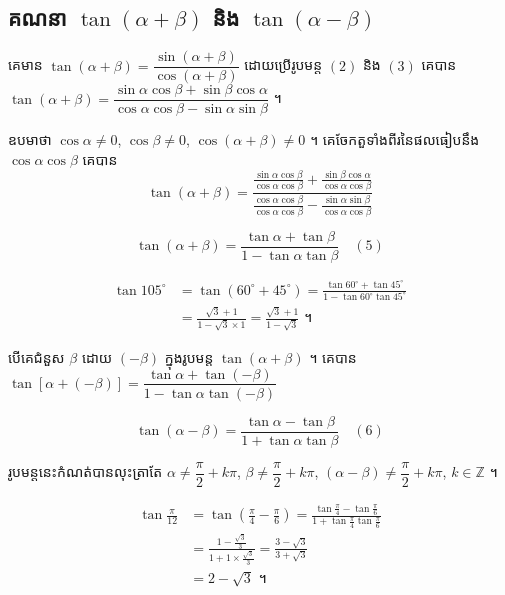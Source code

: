 \subsection{គណនា \texorpdfstring{$\tan(\alpha + \beta)$}{tan(α + β)} និង \texorpdfstring{$\tan(\alpha - \beta)$}{tan(α − β)}}

គេមាន $\tan(\alpha + \beta) = \dfrac{\sin(\alpha + \beta)}{\cos(\alpha + \beta)}$ ដោយប្រើរូបមន្ត $(2)$ និង $(3)$ គេបាន $\tan(\alpha + \beta) = \dfrac{\sin\alpha\cos\beta + \sin\beta\cos\alpha}{\cos\alpha\cos\beta - \sin\alpha\sin\beta}$ ។

ឧបមាថា $\cos\alpha \ne 0$, $\cos\beta \ne 0$, $\cos(\alpha + \beta) \ne 0$ ។ គេចែកតួទាំងពីរនៃផលធៀបនឹង $\cos\alpha\cos\beta$ គេបាន
\[ \tan(\alpha + \beta) = \frac{\frac{\sin\alpha\cos\beta}{\cos\alpha\cos\beta} + \frac{\sin\beta\cos\alpha}{\cos\alpha\cos\beta}}{\frac{\cos\alpha\cos\beta}{\cos\alpha\cos\beta} - \frac{\sin\alpha\sin\beta}{\cos\alpha\cos\beta}} \]
\begin{formulaBox}[ឬ]
\[ \tan(\alpha + \beta) = \frac{\tan\alpha + \tan\beta}{1 - \tan\alpha\tan\beta} \quad (5) \]
\end{formulaBox}

\begin{example}[ឧទាហរណ៍ ៦]
\[
\begin{aligned}
\tan 105^\circ &= \tan(60^\circ + 45^\circ) = \frac{\tan 60^\circ + \tan 45^\circ}{1 - \tan 60^\circ\tan 45^\circ}\\
&= \frac{\sqrt{3} + 1}{1 - \sqrt{3} \times 1} = \frac{\sqrt{3} + 1}{1 - \sqrt{3}} \text{ ។}
\end{aligned}
\]
\end{example}

បើគេជំនួស $\beta$ ដោយ $(-\beta)$ ក្នុងរូបមន្ត $\tan(\alpha + \beta)$ ។ គេបាន $\tan[\alpha + (-\beta)] = \dfrac{\tan\alpha + \tan(-\beta)}{1 - \tan\alpha\tan(-\beta)}$
\begin{formulaBox}[រូបមន្ត]
\[ \tan(\alpha - \beta) = \frac{\tan\alpha - \tan\beta}{1 + \tan\alpha\tan\beta} \quad (6) \]
\end{formulaBox}
រូបមន្តនេះកំណត់បានលុះត្រាតែ $\alpha \ne \dfrac{\pi}{2} + k\pi$, $\beta \ne \dfrac{\pi}{2} + k\pi$, $(\alpha - \beta) \ne \dfrac{\pi}{2} + k\pi$, $k \in \mathbb{Z}$ ។

\begin{example}[ឧទាហរណ៍ ៧]
\[
\begin{aligned}
\tan\frac{\pi}{12} &= \tan\left(\frac{\pi}{4} - \frac{\pi}{6}\right) = \frac{\tan\frac{\pi}{4} - \tan\frac{\pi}{6}}{1 + \tan\frac{\pi}{4}\tan\frac{\pi}{6}}\\
&= \frac{1 - \frac{\sqrt{3}}{3}}{1 + 1 \times \frac{\sqrt{3}}{3}} = \frac{3 - \sqrt{3}}{3 + \sqrt{3}}\\
&= 2 - \sqrt{3} \text{ ។}
\end{aligned}
\]
\end{example}

